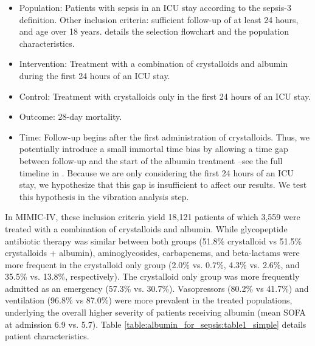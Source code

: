 \documentclass[10pt,letterpaper]{article}
\begin{document}
\begin{itemize}[leftmargin=2ex]
  \item \textcolor{P}{Population}: Patients with sepsis in an ICU stay according
        to the sepsis-3 definition. Other inclusion criteria: sufficient
        follow-up of at least 24 hours, and age over 18 years.
         details the selection flowchart and
         the population
        characteristics.

  \item \textcolor{I}{Intervention}: Treatment with a combination of
        crystalloids and albumin during the first 24 hours of an ICU stay.

  \item \textcolor{C}{Control}: Treatment with crystalloids only in the first 24
        hours of an ICU stay.

  \item \textcolor{O}{Outcome}: 28-day mortality.

  \item \textcolor{T}{Time}: Follow-up begins after the first administration of
        crystalloids. Thus, we potentially introduce a small immortal time bias
        by allowing a time gap between follow-up and the start of the albumin
        treatment --see the full timeline in . Because
        we are only considering the first 24 hours of an ICU stay, we
        hypothesize that this gap is insufficient to affect our results. We test
        this hypothesis in the vibration analysis step.
\end{itemize}

In MIMIC-IV, these inclusion criteria yield 18,121 patients of which 3,559 were treated with a combination of crystalloids and albumin. While glycopeptide antibiotic therapy   was similar between both groups (51.8\% crystalloid vs 51.5\% crystalloids + albumin), aminoglycosides, carbapenems, and beta-lactams were more frequent in the crystalloid only group (2.0\% vs. 0.7\%, 4.3\% vs. 2.6\%, and 35.5\% vs. 13.8\%, respectively). The crystalloid only group was more frequently admitted as an emergency (57.3\% vs. 30.7\%). Vasopressors (80.2\% vs 41.7\%) and ventilation (96.8\% vs 87.0\%) were more prevalent in the treated populations, underlying the overall higher severity of patients receiving albumin (mean SOFA at admission 6.9 vs. 5.7).
Table \ref{table:albumin_for_sepsis:table1_simple} details
patient characteristics.
\end{document}
